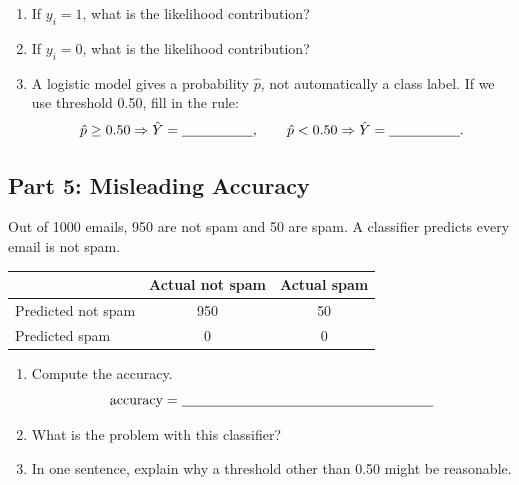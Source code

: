 \documentclass{article}
\newcommand{\blankline}[1]{\underline{\hspace{#1}}}
\begin{document}
\begin{enumerate}[label={\bfseries (\Alph*)},itemsep=.8em]
\item If $y_i=1$, what is the likelihood contribution? \hfill \blankline{1.5in}
\item If $y_i=0$, what is the likelihood contribution? \hfill \blankline{1.5in}
\item A logistic model gives a probability $\hat p$, not automatically a class label. If we use threshold 0.50, fill in the rule:
\[
\hat p \ge 0.50 \Rightarrow \hat Y = \blankline{.7in}, \qquad \hat p < 0.50 \Rightarrow \hat Y = \blankline{.7in}.
\]
\end{enumerate}

\subsection*{Part 5: Misleading Accuracy}
Out of 1000 emails, 950 are not spam and 50 are spam. A classifier predicts every email is not spam.

\begin{center}
\renewcommand{\arraystretch}{1.35}
\begin{tabular}{lcc}
\toprule
 & \textbf{Actual not spam} & \textbf{Actual spam} \\
\midrule
Predicted not spam & 950 & 50 \\
Predicted spam & 0 & 0 \\
\bottomrule
\end{tabular}
\end{center}

\begin{enumerate}[label={\bfseries (\Alph*)},itemsep=.8em]
\item Compute the accuracy.
\[
\text{accuracy}=\blankline{2.5in}
\]
\item What is the problem with this classifier? \\[3.5em]
\item In one sentence, explain why a threshold other than 0.50 might be reasonable. \\[3.5em]
\end{enumerate}
\end{document}
